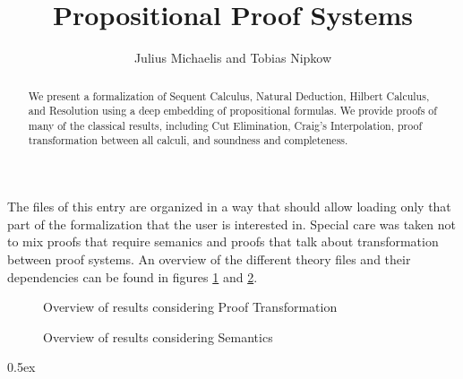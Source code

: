 \documentclass[11pt,a4paper]{article}
\begin{document}
\title{Propositional Proof Systems}
\author{Julius Michaelis and Tobias Nipkow}
\maketitle
\begin{abstract}
We present a formalization of Sequent Calculus, Natural Deduction, Hilbert Calculus, and Resolution using a deep embedding of propositional formulas. 
We provide proofs of many of the classical results, including Cut Elimination, Craig's Interpolation, proof transformation between all calculi, and soundness and completeness. 
\end{abstract}

\tableofcontents
\vspace{1em}

The files of this entry are organized in a way that should allow loading only that part of the formalization that the user is interested in.
Special care was taken not to mix proofs that require semanics and proofs that talk about transformation between proof systems.
An overview of the different theory files and their dependencies can be found in figures \ref{fig:prooftran} and \ref{fig:sema}.

\begin{figure}
	\centering
	
	\caption{Overview of results considering Proof Transformation}
	\label{fig:prooftran}
\end{figure}
\begin{figure}
	\centering
	
	\caption{Overview of results considering Semantics}
	\label{fig:sema}
\end{figure}

\parindent 0pt\parskip 0.5ex





\end{document}
